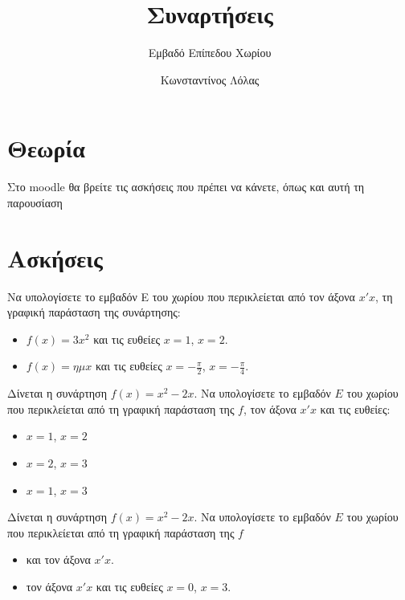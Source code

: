 \documentclass{../presentation}
\title{Συναρτήσεις}
\subtitle{Εμβαδό Επίπεδου Χωρίου}
\author[Λόλας]{Κωνσταντίνος Λόλας}
\institute[$10^ο$ ΓΕΛ]{$10^ο$ ΓΕΛ Θεσσαλονίκης}
\begin{document}
\begin{frame}
  \titlepage
\end{frame}

\section{Θεωρία}

\begin{frame}[noframenumbering]
  Στο moodle θα βρείτε τις ασκήσεις που πρέπει να κάνετε, όπως και αυτή τη παρουσίαση
\end{frame}

\section{Ασκήσεις}

\exercises

\begin{askisi}
  Να υπολογίσετε το εμβαδόν E του χωρίου που περικλείεται από τον άξονα $x'x$, τη γραφική παράσταση της συνάρτησης:
  \begin{itemize}[<+->]
    \item $f(x)=3x^2$ και τις ευθείες $x=1$, $x=2$.
    \item $f(x)=ημx$ και τις ευθείες $x=-\frac{π}{2}$, $x=-\frac{π}{4}$.
  \end{itemize}
\end{askisi}

\begin{askisi}
  Δίνεται η συνάρτηση $f(x)=x^2-2x$. Να υπολογίσετε το εμβαδόν $E$ του χωρίου που περικλείεται από τη γραφική παράσταση της $f$, τον άξονα $x'x$ και τις ευθείες:
  \begin{itemize}[<+->]
    \item $x=1$, $x=2$
    \item $x=2$, $x=3$
    \item $x=1$, $x=3$
  \end{itemize}
\end{askisi}

\begin{askisi}
  Δίνεται η συνάρτηση $f(x)=x^2-2x$. Να υπολογίσετε το εμβαδόν $E$ του χωρίου που περικλείεται από τη γραφική παράσταση της $f$
  \begin{itemize}[<+->]
    \item και τον άξονα $x'x$.
    \item τον άξονα $x'x$ και τις ευθείες $x=0$, $x=3$.
  \end{itemize}
\end{askisi}
\end{document}
